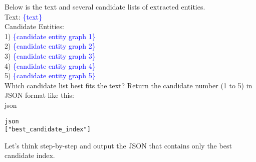 \documentclass{article} %
\begin{document}
\begin{mycolorbox}
\scriptsize
Below is the text and several candidate lists of extracted entities. \\
Text: \textcolor{blue}{\{text\}} \\
Candidate Entities: \\
1) \textcolor{blue}{\{candidate entity graph 1\}} \\
2) \textcolor{blue}{\{candidate entity graph 2\}} \\
3) \textcolor{blue}{\{candidate entity graph 3\}} \\
4) \textcolor{blue}{\{candidate entity graph 4\}} \\
5) \textcolor{blue}{\{candidate entity graph 5\}} \\
Which candidate list best fits the text? Return the candidate number (1 to 5) in JSON format like this: \\
json 
\begin{verbatim}
json
["best_candidate_index"]
\end{verbatim}

Let's think step-by-step and output the JSON that contains only the best candidate index.

\end{mycolorbox}
\end{document}

